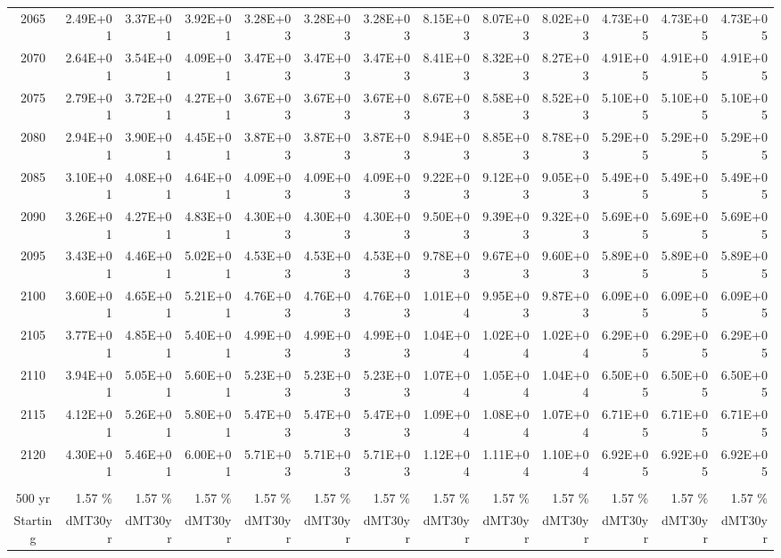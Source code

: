 \documentclass{article}
\begin{document}
\begin{table}
\begin{tabular}{crrr|rrr|rrr|rrr}
2065     & 2.49E+01 & 3.37E+01 & 3.92E+01 & 3.28E+03 & 3.28E+03 & 3.28E+03 & 8.15E+03 & 8.07E+03 & 8.02E+03 & 4.73E+05 & 4.73E+05 & 4.73E+05 \\
2070     & 2.64E+01 & 3.54E+01 & 4.09E+01 & 3.47E+03 & 3.47E+03 & 3.47E+03 & 8.41E+03 & 8.32E+03 & 8.27E+03 & 4.91E+05 & 4.91E+05 & 4.91E+05 \\
2075     & 2.79E+01 & 3.72E+01 & 4.27E+01 & 3.67E+03 & 3.67E+03 & 3.67E+03 & 8.67E+03 & 8.58E+03 & 8.52E+03 & 5.10E+05 & 5.10E+05 & 5.10E+05 \\
2080     & 2.94E+01 & 3.90E+01 & 4.45E+01 & 3.87E+03 & 3.87E+03 & 3.87E+03 & 8.94E+03 & 8.85E+03 & 8.78E+03 & 5.29E+05 & 5.29E+05 & 5.29E+05 \\
2085     & 3.10E+01 & 4.08E+01 & 4.64E+01 & 4.09E+03 & 4.09E+03 & 4.09E+03 & 9.22E+03 & 9.12E+03 & 9.05E+03 & 5.49E+05 & 5.49E+05 & 5.49E+05 \\
2090     & 3.26E+01 & 4.27E+01 & 4.83E+01 & 4.30E+03 & 4.30E+03 & 4.30E+03 & 9.50E+03 & 9.39E+03 & 9.32E+03 & 5.69E+05 & 5.69E+05 & 5.69E+05 \\
2095     & 3.43E+01 & 4.46E+01 & 5.02E+01 & 4.53E+03 & 4.53E+03 & 4.53E+03 & 9.78E+03 & 9.67E+03 & 9.60E+03 & 5.89E+05 & 5.89E+05 & 5.89E+05 \\
2100     & 3.60E+01 & 4.65E+01 & 5.21E+01 & 4.76E+03 & 4.76E+03 & 4.76E+03 & 1.01E+04 & 9.95E+03 & 9.87E+03 & 6.09E+05 & 6.09E+05 & 6.09E+05 \\
2105     & 3.77E+01 & 4.85E+01 & 5.40E+01 & 4.99E+03 & 4.99E+03 & 4.99E+03 & 1.04E+04 & 1.02E+04 & 1.02E+04 & 6.29E+05 & 6.29E+05 & 6.29E+05 \\
2110     & 3.94E+01 & 5.05E+01 & 5.60E+01 & 5.23E+03 & 5.23E+03 & 5.23E+03 & 1.07E+04 & 1.05E+04 & 1.04E+04 & 6.50E+05 & 6.50E+05 & 6.50E+05 \\
2115     & 4.12E+01 & 5.26E+01 & 5.80E+01 & 5.47E+03 & 5.47E+03 & 5.47E+03 & 1.09E+04 & 1.08E+04 & 1.07E+04 & 6.71E+05 & 6.71E+05 & 6.71E+05 \\
2120     & 4.30E+01 & 5.46E+01 & 6.00E+01 & 5.71E+03 & 5.71E+03 & 5.71E+03 & 1.12E+04 & 1.11E+04 & 1.10E+04 & 6.92E+05 & 6.92E+05 & 6.92E+05 \\
         &          &          &          &          &          &          &          &          &          &          &          &          \\ \hline
500 yr   & 1.57 \%  & 1.57 \%  & 1.57 \%  & 1.57 \%  & 1.57 \%  & 1.57 \%  & 1.57 \%  & 1.57 \%  & 1.57 \%  & 1.57 \%  & 1.57 \%  & 1.57 \%  \\
Starting & dMT30yr  & dMT30yr  & dMT30yr  & dMT30yr  & dMT30yr  & dMT30yr  & dMT30yr  & dMT30yr  & dMT30yr  & dMT30yr  & dMT30yr  & dMT30yr  \\

\end{tabular}
\end{table}
\end{document}
